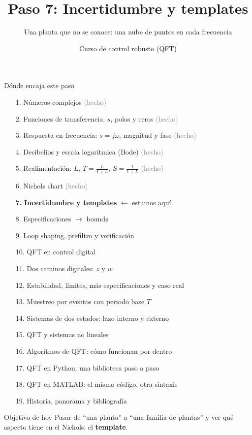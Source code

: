 \documentclass[aspectratio=169,11pt]{beamer}
\title[Incertidumbre y templates]{Paso 7: Incertidumbre y templates}
\subtitle{Una planta que no se conoce: una nube de puntos en cada frecuencia}
\author{Curso de control robusto (QFT)}
\date{}
\begin{document}
\begin{frame}\titlepage\end{frame}

\begin{frame}{Dónde encaja este paso}
  \tiny
  \begin{enumerate}\setlength{\itemsep}{-2pt}
    \item[1.] Números complejos \hfill \textcolor{gray}{(hecho)}
    \item[2.] Funciones de transferencia: $s$, polos y ceros \hfill \textcolor{gray}{(hecho)}
    \item[3.] Respuesta en frecuencia: $s=j\omega$, magnitud y fase \hfill \textcolor{gray}{(hecho)}
    \item[4.] Decibelios y escala logarítmica (Bode) \hfill \textcolor{gray}{(hecho)}
    \item[5.] Realimentación: $L$, $T=\frac{L}{1+L}$, $S=\frac{1}{1+L}$ \hfill \textcolor{gray}{(hecho)}
    \item[6.] Nichols chart \hfill \textcolor{gray}{(hecho)}
    \item[\textbf{7.}] \textbf{Incertidumbre y templates} \hfill $\leftarrow$ estamos aquí
    \item[8.] Especificaciones $\rightarrow$ bounds
    \item[9.] Loop shaping, prefiltro y verificación
    \item[10.] QFT en control digital
    \item[11.] Dos caminos digitales: $z$ y $w$
    \item[12.] Estabilidad, límites, más especificaciones y caso real
    \item[13.] Muestreo por eventos con periodo base $T$
    \item[14.] Sistemas de dos estados: lazo interno y externo
    \item[15.] QFT y sistemas no lineales
    \item[16.] Algoritmos de QFT: cómo funcionan por dentro
    \item[17.] QFT en Python: una biblioteca paso a paso
    \item[18.] QFT en MATLAB: el mismo código, otra sintaxis
    \item[19.] Historia, panorama y bibliografía
  \end{enumerate}
  \vspace{2pt}
  \begin{block}{Objetivo de hoy}
    Pasar de ``una planta'' a ``una familia de plantas'' y ver qué aspecto tiene en el Nichols: el \textbf{template}.
  \end{block}
\end{frame}
\end{document}
